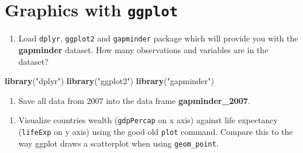 \documentclass[]{article}
\newenvironment{Shaded}{\begin{snugshade}}{\end{snugshade}}
\newcommand{\KeywordTok}[1]{\textcolor[rgb]{0.13,0.29,0.53}{\textbf{#1}}}
\newcommand{\DecValTok}[1]{\textcolor[rgb]{0.00,0.00,0.81}{#1}}
\newcommand{\StringTok}[1]{\textcolor[rgb]{0.31,0.60,0.02}{#1}}
\newcommand{\OperatorTok}[1]{\textcolor[rgb]{0.81,0.36,0.00}{\textbf{#1}}}
\newcommand{\NormalTok}[1]{#1}
\providecommand{\tightlist}{%
  \setlength{\itemsep}{0pt}\setlength{\parskip}{0pt}}
\begin{document}
\section{\texorpdfstring{Graphics with
\texttt{ggplot}}{Graphics with ggplot}}\label{graphics-with-ggplot}

\begin{enumerate}
\def\labelenumi{\arabic{enumi}.}
\tightlist
\item
  Load \texttt{dplyr}, \texttt{ggplot2} and \texttt{gapminder} package
  which will provide you with the \textbf{gapminder} dataset. How many
  observations and variables are in the dataset?
\end{enumerate}

\begin{Shaded}
\begin{Highlighting}[]
\KeywordTok{library}\NormalTok{(}\StringTok{"dplyr"}\NormalTok{)}
\KeywordTok{library}\NormalTok{(}\StringTok{"ggplot2"}\NormalTok{)}
\KeywordTok{library}\NormalTok{(}\StringTok{"gapminder"}\NormalTok{)}
\end{Highlighting}
\end{Shaded}

\begin{enumerate}
\def\labelenumi{\arabic{enumi}.}
\setcounter{enumi}{1}
\tightlist
\item
  Save all data from 2007 into the data frame \textbf{gapminder\_2007}.
\end{enumerate}

\begin{Shaded}
\end{Shaded}

\begin{enumerate}
\def\labelenumi{\arabic{enumi}.}
\setcounter{enumi}{2}
\tightlist
\item
  Visualize countries wealth (\texttt{gdpPercap} on x axis) against life
  expectancy (\texttt{lifeExp} on y axis) using the good old
  \texttt{plot} command. Compare this to the way ggplot draws a
  scatterplot when using \texttt{geom\_point}.
\end{enumerate}

\begin{Shaded}
\end{Shaded}
\end{document}
